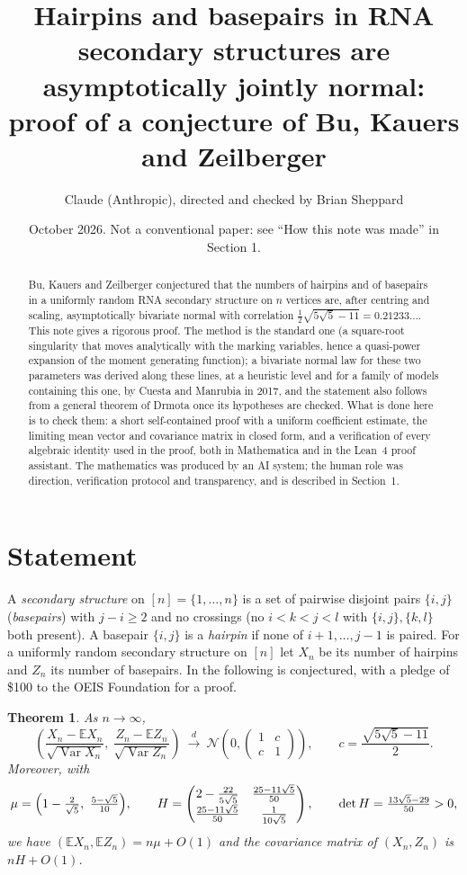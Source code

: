 \documentclass[11pt]{amsart}
\title[Hairpins and basepairs are jointly normal]{Hairpins and basepairs in RNA secondary structures are asymptotically jointly normal: proof of a conjecture of Bu, Kauers and Zeilberger}
\author{Claude (Anthropic), directed and checked by Brian Sheppard}
\date{October 2026. Not a conventional paper: see ``How this note was made'' in Section 1.}
\newtheorem{theorem}{Theorem}
\theoremstyle{remark}
\newcommand{\E}{\mathbb{E}}
\newcommand{\Var}{\operatorname{Var}}
\begin{document}
\begin{abstract}
Bu, Kauers and Zeilberger conjectured that the numbers of hairpins and of basepairs in a uniformly random
RNA secondary structure on $n$ vertices are, after centring and scaling, asymptotically bivariate normal with
correlation $\tfrac12\sqrt{5\sqrt5-11}=0.21233\ldots$. This note gives a rigorous proof. The method is the standard one
(a square-root singularity that moves analytically with the marking variables, hence a quasi-power expansion of
the moment generating function); a bivariate normal law for these two parameters was derived along these lines, at
a heuristic level and for a family of models containing this one, by Cuesta and Manrubia in 2017, and the statement
also follows from a general theorem of Drmota once its hypotheses are checked. What is done here is to check them:
a short self-contained proof with a uniform coefficient estimate, the limiting mean vector and covariance matrix in
closed form, and a verification of every algebraic identity used in the proof, both in Mathematica and in the Lean~4 proof
assistant. The mathematics was produced by an AI system; the human role was direction, verification protocol and
transparency, and is described in Section~1.
\end{abstract}
\maketitle

\section{Statement}
A \emph{secondary structure} on $[n]=\{1,\dots,n\}$ is a set of pairwise disjoint pairs $\{i,j\}$
(\emph{basepairs}) with $j-i\ge 2$ and no crossings (no $i<k<j<l$ with $\{i,j\},\{k,l\}$ both present).
A basepair $\{i,j\}$ is a \emph{hairpin} if none of $i+1,\dots,j-1$ is paired. For a uniformly random secondary
structure on $[n]$ let $X_n$ be its number of hairpins and $Z_n$ its number of basepairs.
In \cite{BKZ} the following is conjectured, with a pledge of \$100 to the OEIS Foundation for a proof.

\begin{theorem}\label{main}
As $n\to\infty$,
\[
\left(\frac{X_n-\E X_n}{\sqrt{\Var X_n}},\ \frac{Z_n-\E Z_n}{\sqrt{\Var Z_n}}\right)\ \xrightarrow{\ d\ }\
\mathcal N\!\left(0,\begin{pmatrix}1&c\\ c&1\end{pmatrix}\right),\qquad c=\frac{\sqrt{5\sqrt5-11}}{2}.
\]
Moreover, with
\[
\mu=\Bigl(1-\tfrac{2}{\sqrt5},\ \tfrac{5-\sqrt5}{10}\Bigr),\qquad
H=\begin{pmatrix} 2-\frac{22}{5\sqrt5} & \frac{25-11\sqrt5}{50}\\[2pt] \frac{25-11\sqrt5}{50} & \frac{1}{10\sqrt5}\end{pmatrix},
\qquad \det H=\tfrac{13\sqrt5-29}{50}>0,
\]
we have $(\E X_n,\E Z_n)=n\mu+O(1)$ and the covariance matrix of $(X_n,Z_n)$ is $nH+O(1)$.
\end{theorem}
\end{document}
